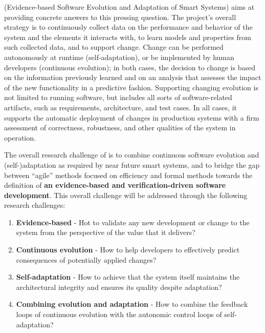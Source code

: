 \documentclass[12pt]{article}
\begin{document}
\name{} (Evidence-based Software Evolution and Adaptation of Smart Systems) 
aims at providing concrete answers to this pressing question. The project's overall strategy is to continuously collect data on the performance and behavior of the system and the elements it interacts with, to learn models and properties from such collected data, and to support change. %
Change can be performed autonomously at runtime (self-adaptation), or be implemented by human developers (continuous evolution); in both cases, the decision to change is based on the information previously learned and on an analysis that assesses the impact of the new functionality in a predictive fashion. %
Supporting changing evolution is not limited to running software, but includes all sorts of software-related artifacts, such as requirements, architecture, and test cases.
In all cases, it supports the automatic deployment of changes in production systems with a firm assessment of correctness, robustness, and other qualities of the system in operation.

The overall research challenge of \name{} is to combine continuous software evolution and (self-)adaptation as required by near future smart systems, and to
bridge the gap between ``agile'' methods focused on efficiency and formal methods towards the definition of {\bf an evidence-based and verification-driven software development}. This overall challenge will be addressed through the following research challenges:

\begin{enumerate}
\item {\bf Evidence-based} - Hot to validate any new development or change to the system from the perspective of the value that it delivers?\vspace{-.2cm}
\item {\bf Continuous evolution} - How to help developers to effectively predict consequences of potentially applied changes?\vspace{-.2cm}
\item {\bf Self-adaptation} - How to achieve that the system itself maintains the architectural integrity and ensures its quality despite adaptation?\vspace{-.2cm}
\item {\bf Combining evolution and adaptation} - How to combine the feedback loops of continuous evolution with the autonomic control loops of self-adaptation?
\end{enumerate}
\end{document}

